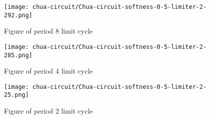 \documentclass[main]{subfiles}
\begin{document}
{%
\setlength{\fboxsep}{0pt}
\setlength{\fboxrule}{1pt}

\begin{comment}
\hspace*{-0.2\textwidth}
\begin{minipage}{1.3\textwidth}
\begin{figure}[H]
\centering
\fbox{
}
\caption[Figure of period 24 limit cycle]{Figure of period 24 limit cycle}
\label{figure:chaotictrajectories}
\end{figure}
\end{minipage}

\hspace*{-0.2\textwidth}
\begin{minipage}{1.3\textwidth}
\begin{figure}[H]
\centering
\fbox{
}
\caption[Figure of period 10 limit cycle]{Figure of period 10 limit cycle}
\label{figure:chaotictrajectories}
\end{figure}
\end{minipage}
\end{comment}

}%


\begin{figure}[H]
\centering
\texttt{[image: chua-circuit/Chua-circuit-softness-0-5-limiter-2-292.png]}
\caption[Figure of period 8 limit cycle]{Figure of period 8 limit cycle}
\label{figure:chaotictrajectories}
\end{figure}

\begin{figure}[H]
\centering
\texttt{[image: chua-circuit/Chua-circuit-softness-0-5-limiter-2-285.png]}
\caption[Figure of period 4 limit cycle]{Figure of period 4 limit cycle}
\label{figure:chaotictrajectories}
\end{figure}

\begin{figure}[H]
\centering
\texttt{[image: chua-circuit/Chua-circuit-softness-0-5-limiter-2-25.png]}
\caption[Figure of period 3 limit cycle]{Figure of period 2 limit cycle}
\label{figure:chaotictrajectories}
\end{figure}
\end{document}
